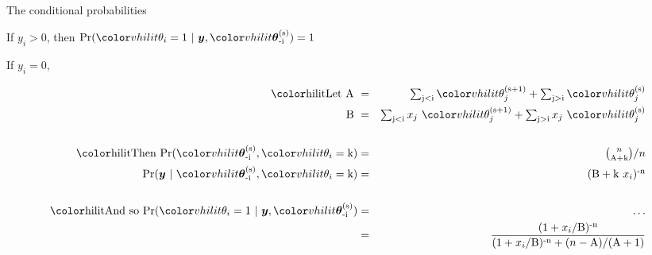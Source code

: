\documentclass[aspectratio=169,12pt,t]{beamer}
\begin{document}
\begin{frame}{The conditional probabilities}

If $y_i > 0$, then $\text{Pr}({\vhilit \theta_i} =
1 \ | \ \boldsymbol{y}, {\vhilit
\boldsymbol{\theta}_\text{-i}^\text{(s)}}) = 1$

\vspace{10mm}

If $y_i = 0$,

\vspace{-15mm}

\begin{eqnarray*}
\text{{\hilit Let} A } & = & \textstyle{\sum_{\text{j} < \text{i}} {\vhilit
\theta_j^\text{(s+1)}} + \sum_{\text{j} > \text{i}} {\vhilit
\theta_j^\text{(s)}}} \\
\text{B } & = & \textstyle{\sum_{\text{j} < \text{i}}
x_j \ {\vhilit
\theta_j^\text{(s+1)}} + \sum_{\text{j} > \text{i}}
x_j \ {\vhilit
\theta_j^\text{(s)}}} \\
\\
\text{\hilit Then } \text{Pr}({\vhilit
\boldsymbol{\theta}_\text{-i}^\text{(s)}}, {\vhilit
\theta_i}=\text{k}) & = & \textstyle{{n \choose
\text{A}+\text{k}} / n} \\
\text{Pr}(\boldsymbol{y} \ | \ {\vhilit
\boldsymbol{\theta}_\text{-i}^\text{(s)}}, {\vhilit
\theta_i}=\text{k}) & = & \textstyle{(\text{B} + \text{k} \
x_i)^\text{-n}}
\\ \\
\text{\hilit And so } \text{Pr}({\vhilit \theta_i} = 1
\ | \ \boldsymbol{y}, {\vhilit
\boldsymbol{\theta}_\text{-i}^\text{(s)}}) & = &  \dots \\
& = & \frac{(1 +
x_i/\text{B})^\text{-n}}{(1 +
x_i/\text{B})^\text{-n} + (n - \text{A}) /
(\text{A} + 1)}
\end{eqnarray*}


\note{
}
\end{frame}
\end{document}
